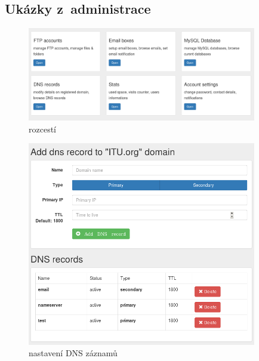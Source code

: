 \documentclass[11pt,a4paper]{article}
\begin{document}
    \subsection{Ukázky z~administrace}

    \begin{figure}[ht]
      \begin{center}
        \includegraphics[width=10cm]{dashboard}
        \caption{rozcestí}
      \end{center}
    \end{figure}

    \begin{figure}[ht]
      \begin{center}
        \includegraphics[width=10cm]{dns}
        \caption{nastavení DNS záznamů}
      \end{center}
    \end{figure}
\end{document}
